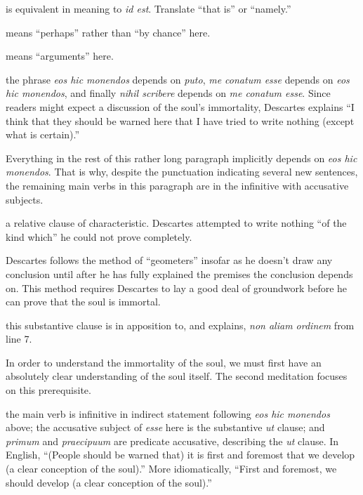  is equivalent in meaning to \textit{id est}. Translate ``that is'' or ``namely.''

 means ``perhaps'' rather than ``by chance'' here.

 means ``arguments'' here.

 the phrase \textit{eos hic monendos} depends on \textit{puto}, \textit{me conatum esse} depends on \textit{eos hic monendos}, and finally \textit{nihil scribere} depends on \textit{me conatum esse}. Since readers might expect a discussion of the soul's immortality, Descartes explains ``I think that they should be warned here that I have tried to write nothing (except what is certain).''

Everything in the rest of this rather long paragraph implicitly depends on \textit{eos hic monendos}. That is why, despite the punctuation indicating several new sentences, the remaining main verbs in this paragraph are in the infinitive with accusative subjects.

  a relative clause of characteristic. Descartes attempted to write nothing ``of the kind which'' he could not prove completely.

 Descartes follows the method of ``geometers'' insofar as he doesn't draw any conclusion until after he has fully explained the premises the conclusion depends on. This method requires Descartes to lay a good deal of groundwork before he can prove that the soul is immortal.

 this substantive clause is in apposition to, and explains, \textit{non aliam ordinem} from line 7.

 In order to understand the immortality of the soul, we must first have an absolutely clear understanding of the soul itself. The second meditation focuses on this prerequisite.

 the main verb is infinitive in indirect statement following \textit{eos hic monendos} above; the accusative subject of \textit{esse} here is the substantive \textit{ut} clause; and \textit{primum} and \textit{praecipuum} are predicate accusative, describing the \textit{ut} clause. In English, ``(People should be warned that) it is first and foremost that we develop (a clear conception of the soul).'' More idiomatically, ``First and foremost, we should develop (a clear conception of the soul).''

